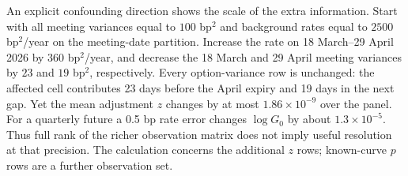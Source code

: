 An explicit confounding direction shows the scale of the extra information. Start with all meeting variances equal to $100$ bp$^2$ and background rates equal to $2500$ bp$^2$/year on the meeting-date partition. Increase the rate on 18 March--29 April 2026 by $360$ bp$^2$/year, and decrease the 18 March and 29 April meeting variances by $23$ and $19$ bp$^2$, respectively. Every option-variance row is unchanged: the affected cell contributes 23 days before the April expiry and 19 days in the next gap. Yet the mean adjustment $z$ changes by at most $1.86\times10^{-9}$ over the panel. For a quarterly future a 0.5 bp rate error changes $\log G_0$ by about $1.3\times10^{-5}$. Thus full rank of the richer observation matrix does not imply useful resolution at that precision. The calculation concerns the additional $z$ rows; known-curve $p$ rows are a further observation set.
